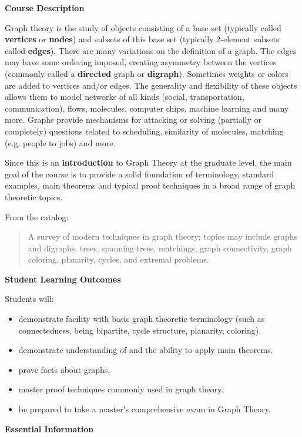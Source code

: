 \documentclass[12pt]{article}
\renewcommand{\emph}[1]{\textsf{\textbf{#1}}}
\begin{document}
\quad


\textbf{\large{Course Description}}

Graph theory is the study of objects consisting of a base set (typically called \emph{vertices} or \emph{nodes}) and subsets of this base set (typically 2-element subsets called \emph{edges}). There are many variations on the definition of a graph. The  edges may have some ordering imposed, creating asymmetry between the vertices (commonly called a \emph{directed} graph or \emph{digraph}). Sometimes weights or colors are added to vertices and/or edges. The generality and flexibility of these objects allows them to model networks of all kinds (social, transportation, communication), flows, molecules, computer chips, machine learning and many more. Graphs provide mechanisms for attacking or solving (partially or completely) questions related to scheduling, similarity of molecules, matching (e.g. people to jobs) and more.

Since this is an \emph{introduction} to Graph Theory at the graduate level, the main goal of the course is to provide a solid foundation of terminology, standard examples, main theorems and typical proof techniques in a broad range of graph theoretic topics.

From the catalog: \begin{quote} A survey of modern techniques in graph theory; topics may include graphs and digraphs, trees, spanning trees, matchings, graph connectivity, graph coloring, planarity, cycles, and extremal problems. \end{quote}

\textbf{\large{Student Learning Outcomes}} 

Students will: 
	\begin{itemize}
	\item demonstrate facility with basic graph theoretic terminology (such as connectedness, being bipartite, cycle structure, planarity, coloring).
	\item demonstrate understanding of and the ability to apply main theorems. 
	\item prove facts about graphs.
	\item master proof techniques commonly used in graph theory.
	\item be prepared to take a master's comprehensive exam in Graph Theory.
	\end{itemize}
	
\textbf{\large{Essential Information}}
\end{document}
